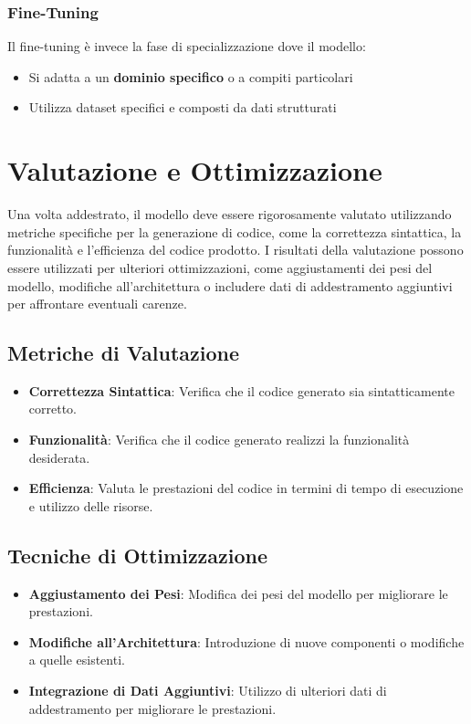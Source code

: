 \documentclass[12pt,a4paper,openright,twoside]{book}
\begin{document}
\subsubsection{Fine-Tuning}
Il fine-tuning è invece la fase di specializzazione dove il modello:
\begin{itemize}
    \item Si adatta a un \textbf{dominio specifico} o a compiti particolari
    \item Utilizza dataset specifici e composti da dati strutturati 
\end{itemize}

\section{Valutazione e Ottimizzazione}
Una volta addestrato, il modello deve essere rigorosamente valutato utilizzando metriche specifiche per la generazione di codice, come la correttezza sintattica, la funzionalità e l'efficienza del codice prodotto.
I risultati della valutazione possono essere utilizzati per ulteriori ottimizzazioni, come aggiustamenti dei pesi del modello, modifiche all'architettura o includere dati di addestramento aggiuntivi per affrontare eventuali carenze.

\subsection{Metriche di Valutazione}
\begin{itemize}
    \item \textbf{Correttezza Sintattica}: Verifica che il codice generato sia sintatticamente corretto.
    \item \textbf{Funzionalità}: Verifica che il codice generato realizzi la funzionalità desiderata.
    \item \textbf{Efficienza}: Valuta le prestazioni del codice in termini di tempo di esecuzione e utilizzo delle risorse.
\end{itemize}

\subsection{Tecniche di Ottimizzazione}
\begin{itemize}
    \item \textbf{Aggiustamento dei Pesi}: Modifica dei pesi del modello per migliorare le prestazioni.
    \item \textbf{Modifiche all'Architettura}: Introduzione di nuove componenti o modifiche a quelle esistenti.
    \item \textbf{Integrazione di Dati Aggiuntivi}: Utilizzo di ulteriori dati di addestramento per migliorare le prestazioni.
\end{itemize}
\end{document}
